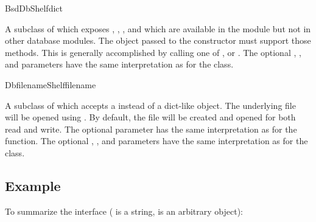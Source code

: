 \begin{classdesc}{BsdDbShelf}{dict}

A subclass of  which exposes ,
, ,  and
 which are available in the  module
but not in other database modules.  The  object passed to
the constructor must support those methods.  This is generally
accomplished by calling one of ,
 or .  The optional
, , and  parameters have the
same interpretation as for the  class.

\end{classdesc}

\begin{classdesc}{DbfilenameShelf}{filename}

A subclass of  which accepts a  instead of
a dict-like object.  The underlying file will be opened using
{}.  By default, the file will be created and
opened for both read and write.  The optional  parameter has
the same interpretation as for the  function.  The
optional , , and  parameters
have the same interpretation as for the  class.
 
\end{classdesc}

\subsection{Example}

To summarize the interface ( is a string,  is an
arbitrary object):

